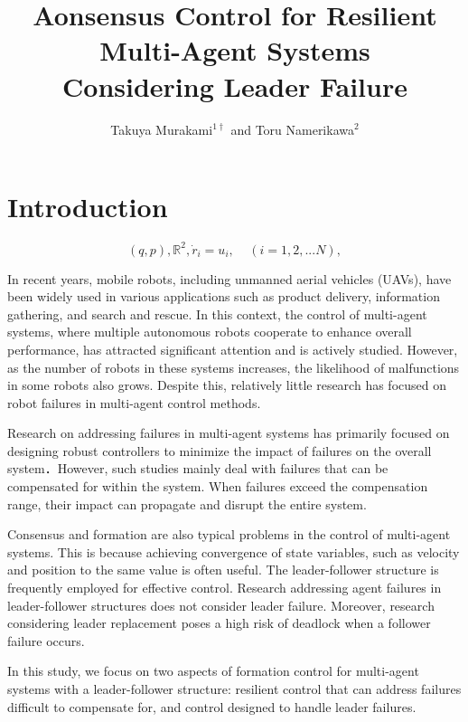 \documentclass[a4paper,fleqn,10pt,twocolumn]{SICE_ISCS}
\title{Aonsensus Control for Resilient Multi-Agent Systems\\
	 Considering Leader Failure}
\author{Takuya Murakami${}^{1\dagger}$ and Toru Namerikawa${}^{2}$}
\begin{document}
\maketitle


\section{Introduction}

\begin{equation}
	\label{modeling}
(q,p),
{\mathbb{R}}^2,
\dot{r}_i=u_i,\ \ \ \ \ (i=1,2,...N),
\end{equation}

In recent years, mobile robots, including unmanned aerial vehicles (UAVs), have been widely used in various applications such as product delivery, information gathering, and search and rescue. In this context, the control of multi-agent systems, where multiple autonomous robots cooperate to enhance overall performance, has attracted significant attention and is actively studied. However, as the number of robots in these systems increases, the likelihood of malfunctions in some robots also grows. Despite this, relatively little research has focused on robot failures in multi-agent control methods.

Research on addressing failures in multi-agent systems has primarily focused on designing robust controllers to minimize the impact of failures on the overall system\cite{Davoodi,2017FTC,2018FTC}．However, such studies mainly deal with  failures that can be compensated for within the system. When failures exceed the compensation range, their impact can propagate and disrupt the entire system.

Consensus and formation are also typical problems in the control of multi-agent systems. This is because achieving convergence of state variables, such as velocity and position to the same value is often useful. The leader-follower structure is frequently employed for effective control. Research addressing agent failures in leader-follower structures\cite{Resi_leaderfollower} does not consider leader failure. Moreover, research considering leader replacement\cite{Affection} poses a high risk of deadlock when a follower failure occurs.

In this study, we focus on two aspects of formation control for multi-agent systems with a leader-follower structure: resilient control that can address failures difficult to compensate for, and control designed to handle leader failures.
\end{document}
